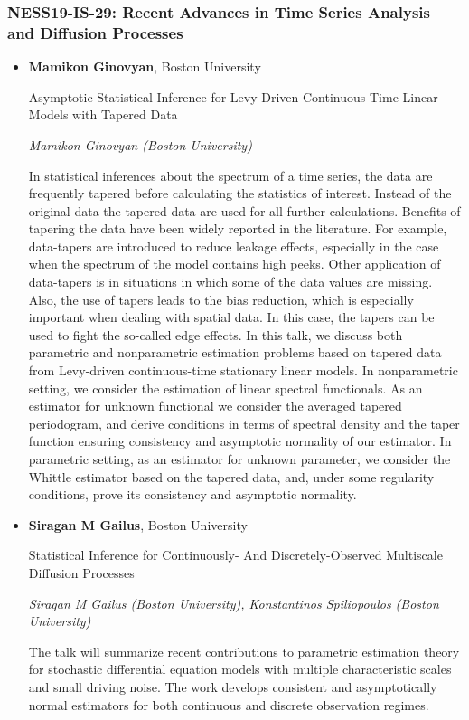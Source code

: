 \subsubsection*{NESS19-IS-29: Recent Advances in Time Series Analysis and Diffusion Processes}

\begin{itemize}
\item \textbf{Mamikon Ginovyan}, Boston University

Asymptotic Statistical Inference for Levy-Driven Continuous-Time Linear Models with Tapered Data

\emph{\footnotesize Mamikon Ginovyan (Boston University)}

In statistical inferences about the spectrum of a time series, the data are frequently tapered before calculating the statistics of interest. Instead of the original data the tapered data are used for all further calculations. Benefits of tapering the data have been widely reported in the literature. For example, data-tapers are introduced to reduce leakage effects, especially in the case when the spectrum of the model contains high peeks. Other application of data-tapers is in situations in which some of the data values are missing. Also, the use of tapers leads to the bias reduction, which is especially important when dealing with spatial data. In this case, the tapers can be used to fight the so-called edge effects. In this talk, we discuss both parametric and nonparametric estimation problems based on tapered data from Levy-driven continuous-time stationary linear models. In nonparametric setting, we consider the estimation of linear spectral functionals. As an estimator for unknown functional we consider the averaged tapered periodogram, and derive conditions in terms of spectral density and the taper function ensuring consistency and asymptotic normality of our estimator. In parametric setting, as an estimator for unknown parameter, we consider the Whittle estimator based on the tapered data, and, under some regularity conditions, prove its consistency and asymptotic normality.

\item \textbf{Siragan M Gailus}, Boston University

Statistical Inference for Continuously- And Discretely-Observed Multiscale Diffusion Processes

\emph{\footnotesize Siragan M Gailus (Boston University), Konstantinos Spiliopoulos (Boston University)}

The talk will summarize recent contributions to parametric estimation theory for stochastic differential equation models with multiple characteristic scales and small driving noise. The work develops consistent and asymptotically normal estimators for both continuous and discrete observation regimes.


\end{itemize}
